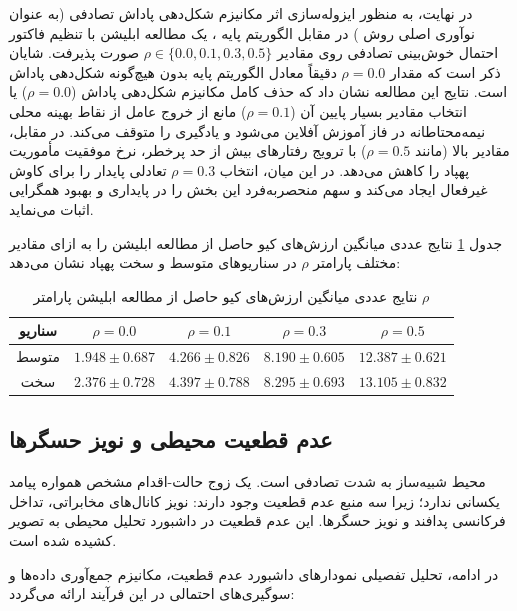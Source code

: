 \documentclass[oneside,openany,a4paper,12pt,draft]{article}
\begin{document}
در نهایت، به منظور ایزوله‌سازی اثر مکانیزم شکل‌دهی پاداش تصادفی (به عنوان نوآوری اصلی روش ) در مقابل الگوریتم پایه ، یک مطالعه ابلیشن  با تنظیم فاکتور احتمال خوش‌بینی تصادفی روی مقادیر \mbox{$\rho \in \{0.0, 0.1, 0.3, 0.5\}$} صورت پذیرفت. شایان ذکر است که مقدار $\rho = 0.0$ دقیقاً معادل الگوریتم  پایه بدون هیچ‌گونه شکل‌دهی پاداش است. نتایج این مطالعه نشان داد که حذف کامل مکانیزم شکل‌دهی پاداش ($\rho=0.0$) یا انتخاب مقادیر بسیار پایین آن ($\rho=0.1$) مانع از خروج عامل از نقاط بهینه محلی نیمه‌محتاطانه در فاز آموزش آفلاین می‌شود و یادگیری را متوقف می‌کند. در مقابل، مقادیر بالا (مانند $\rho=0.5$) با ترویج رفتارهای بیش از حد پرخطر، نرخ موفقیت مأموریت پهپاد را کاهش می‌دهد. در این میان، انتخاب $\rho=0.3$ تعادلی پایدار را برای کاوش غیرفعال ایجاد می‌کند و سهم منحصربه‌فرد این بخش را در پایداری و بهبود همگرایی اثبات می‌نماید.

جدول \ref{tab:ablation_results} نتایج عددی میانگین ارزش‌های کیو حاصل از مطالعه ابلیشن را به ازای مقادیر مختلف پارامتر $\rho$ در سناریوهای متوسط و سخت پهپاد نشان می‌دهد:
\begin{table}[H]
\centering
\caption{نتایج عددی میانگین ارزش‌های کیو حاصل از مطالعه ابلیشن پارامتر $\rho$}
\label{tab:ablation_results}
\begin{tabular}{ccccc}
\hline
\textbf{سناریو} & \textbf{$\rho = 0.0$} & \textbf{$\rho = 0.1$} & \textbf{$\rho = 0.3$} & \textbf{$\rho = 0.5$} \\ \hline
متوسط & $1.948 \pm 0.687$ & $4.266 \pm 0.826$ & $8.190 \pm 0.605$ & $12.387 \pm 0.621$ \\
سخت & $2.376 \pm 0.728$ & $4.397 \pm 0.788$ & $8.295 \pm 0.693$ & $13.105 \pm 0.832$ \\ \hline
\end{tabular}
\end{table}



\subsection{عدم قطعیت محیطی و نویز حسگرها}
محیط شبیه‌ساز به شدت تصادفی است. یک زوج حالت-اقدام مشخص همواره پیامد یکسانی ندارد؛ زیرا سه منبع عدم قطعیت وجود دارند: نویز کانال‌های مخابراتی، تداخل فرکانسی پدافند و نویز حسگرها. این عدم قطعیت در داشبورد تحلیل محیطی به تصویر کشیده شده است.

در ادامه، تحلیل تفصیلی نمودارهای داشبورد عدم قطعیت، مکانیزم جمع‌آوری داده‌ها و سوگیری‌های احتمالی در این فرآیند ارائه می‌گردد:
\end{document}
